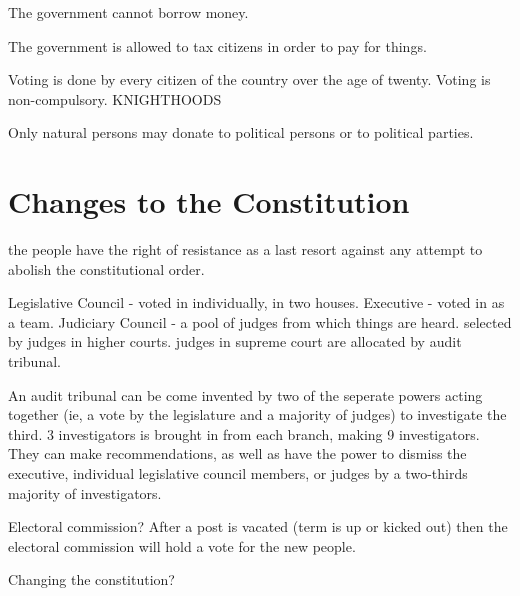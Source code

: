 \documentclass[a4paper]{report}
\begin{document}
The government cannot borrow money.

The government is allowed to tax citizens in order to pay for things.

Voting is done by every citizen of the country over the age of twenty. Voting is non-compulsory.
KNIGHTHOODS

Only natural persons may donate to political persons or to political parties.

\section{Changes to the Constitution}

the people have the right of resistance as a last resort against any attempt to abolish the constitutional order.



Legislative Council - voted in individually, in two houses.
Executive - voted in as a team.
Judiciary Council - a pool of judges from which things are heard. selected by judges in higher courts. judges in supreme court are allocated by audit tribunal.

An audit tribunal can be come invented by two of the seperate powers acting together (ie, a vote by the legislature and a majority of judges) to investigate the third. 3 investigators is brought in from each branch, making 9 investigators. They can make recommendations, as well as have the power to dismiss the executive, individual legislative council members, or judges by a two-thirds majority of investigators.

Electoral commission? After a post is vacated (term is up or kicked out) then the electoral commission will hold a vote for the new people.

Changing the constitution?
\end{document}
